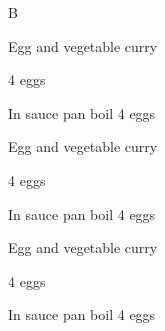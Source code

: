 \begin{menu}{B}
    \begin{recipe}{2}{Egg and vegetable curry}%
    
		\begin{ingredients}
		4  eggs  \\
	
		\end{ingredients}
	
    \begin{instructions}
    \item 
        In sauce pan boil
        4   eggs
    \end{instructions}
    \end{recipe}%
  
    \begin{recipe}{2}{Egg and vegetable curry}%
    
		\begin{ingredients}
		4  eggs  \\
	
		\end{ingredients}
	
    \begin{instructions}
    \item 
        In sauce pan boil
        4   eggs
    \end{instructions}
    \end{recipe}%
  
    \begin{recipe}{2}{Egg and vegetable curry}%
    
		\begin{ingredients}
		4  eggs  \\
	
		\end{ingredients}
	
    \begin{instructions}
    \item 
        In sauce pan boil
        4   eggs
    \end{instructions}
    \end{recipe}%
  
    \clearpage
    \end{menu}
	
	